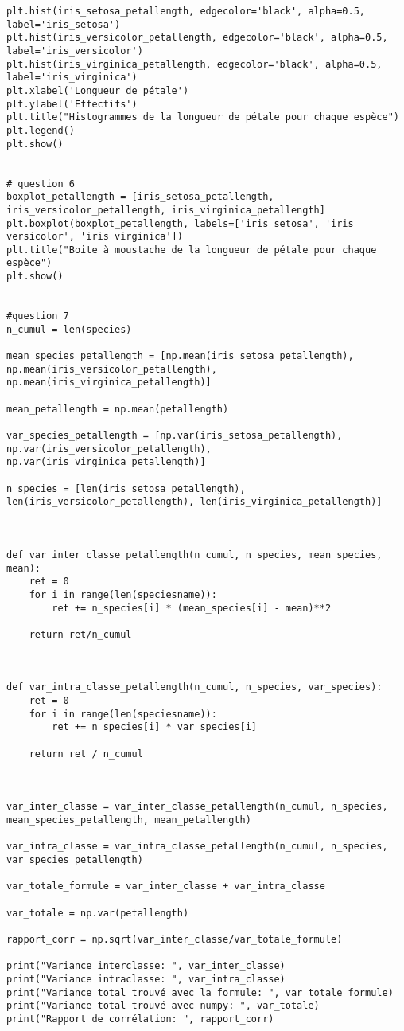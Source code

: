 \begin{lstlisting}[style=myPython, caption=Code Python complet TP2, frame=lines]
plt.hist(iris_setosa_petallength, edgecolor='black', alpha=0.5, label='iris_setosa')
plt.hist(iris_versicolor_petallength, edgecolor='black', alpha=0.5, label='iris_versicolor')
plt.hist(iris_virginica_petallength, edgecolor='black', alpha=0.5, label='iris_virginica')
plt.xlabel('Longueur de pétale')
plt.ylabel('Effectifs')
plt.title("Histogrammes de la longueur de pétale pour chaque espèce")
plt.legend()
plt.show()


# question 6
boxplot_petallength = [iris_setosa_petallength, iris_versicolor_petallength, iris_virginica_petallength]
plt.boxplot(boxplot_petallength, labels=['iris setosa', 'iris versicolor', 'iris virginica'])
plt.title("Boite à moustache de la longueur de pétale pour chaque espèce")
plt.show()


#question 7
n_cumul = len(species)

mean_species_petallength = [np.mean(iris_setosa_petallength), np.mean(iris_versicolor_petallength), np.mean(iris_virginica_petallength)]

mean_petallength = np.mean(petallength)

var_species_petallength = [np.var(iris_setosa_petallength), np.var(iris_versicolor_petallength), np.var(iris_virginica_petallength)]

n_species = [len(iris_setosa_petallength), len(iris_versicolor_petallength), len(iris_virginica_petallength)]



def var_inter_classe_petallength(n_cumul, n_species, mean_species, mean):
    ret = 0
    for i in range(len(speciesname)):
        ret += n_species[i] * (mean_species[i] - mean)**2

    return ret/n_cumul



def var_intra_classe_petallength(n_cumul, n_species, var_species):
    ret = 0
    for i in range(len(speciesname)):
        ret += n_species[i] * var_species[i]

    return ret / n_cumul



var_inter_classe = var_inter_classe_petallength(n_cumul, n_species, mean_species_petallength, mean_petallength)

var_intra_classe = var_intra_classe_petallength(n_cumul, n_species, var_species_petallength)

var_totale_formule = var_inter_classe + var_intra_classe

var_totale = np.var(petallength)

rapport_corr = np.sqrt(var_inter_classe/var_totale_formule)

print("Variance interclasse: ", var_inter_classe)
print("Variance intraclasse: ", var_intra_classe)
print("Variance total trouvé avec la formule: ", var_totale_formule)
print("Variance total trouvé avec numpy: ", var_totale)
print("Rapport de corrélation: ", rapport_corr)
\end{lstlisting}
